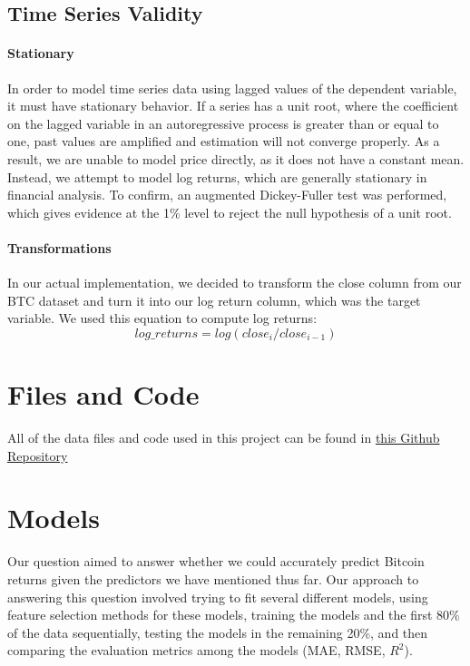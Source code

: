 \documentclass{article}
\begin{document}
\subsection{Time Series Validity}

\paragraph{Stationary}
In order to model time series data using lagged values of the dependent variable, it must have stationary behavior. If a series has a unit root, where the coefficient on the lagged variable in an autoregressive process is greater than or equal to one, past values are amplified and estimation will not converge properly. As a result, we are unable to model price directly, as it does not have a constant mean. Instead, we attempt to model log returns, which are generally stationary in financial analysis. To confirm, an augmented Dickey-Fuller test was performed, which gives evidence at the 1\% level to reject the null hypothesis of a unit root.

\paragraph{Transformations}
In our actual implementation, we decided to transform the close column from our BTC dataset and turn it into our log return column, which was the target variable.
We used this equation to compute log returns: $$log\_returns = log(close_i/close_{i-1})$$

\section{Files and Code}
All of the data files and code used in this project can be found in \href{https://github.com/jsu21ges/stor565-group3-project}{this Github Repository}

\section{Models}
\label{headings}


Our question aimed to answer whether we could accurately predict Bitcoin returns given the predictors we have mentioned thus far. Our approach to answering this question involved trying to fit several different models, using feature selection methods for these models, training the models and the first 80\% of the data sequentially, testing the models in the remaining 20\%, and then comparing the evaluation metrics among the models (MAE, RMSE, $R^2$). 
\end{document}
